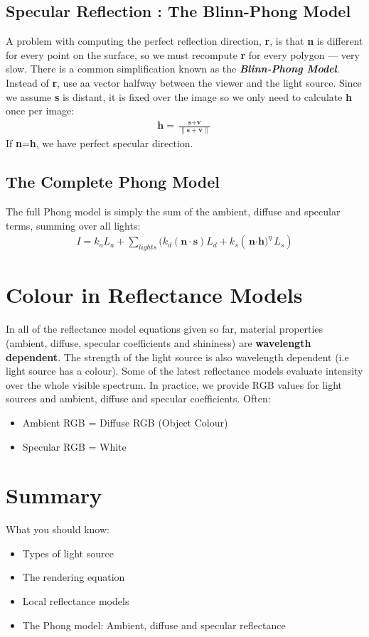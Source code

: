 \documentclass{article}
\begin{document}
\subsection{Specular Reflection : The Blinn-Phong Model}
A problem with computing the perfect reflection direction, \textbf{r}, is that \textbf{n} is different for every point on the surface, so we must recompute \textbf{r} for every polygon --- very slow.
There is a common simplification known as the \textbf{\textit{Blinn-Phong Model}}.
Instead of \textbf{r}, use aa vector halfway between the viewer and the light source.
Since we assume \textbf{s} is distant, it is fixed over the image so we only need to calculate \textbf{h} once per image:
\begin{align*}
	\textbf{h} = \frac{\textbf{s} + \textbf{v}}{\|\textbf{s} + \textbf{v}\|}
\end{align*}
If \textbf{n}=\textbf{h}, we have perfect specular direction.

\subsection{The Complete Phong Model}
The full Phong model is simply the sum of the ambient, diffuse and specular terms, summing over all lights:
\begin{align*}
	I = k_aL_a + \sum_{lights}(k_d(\textbf{n$\cdot$s})L_d + k_s(\textbf{n$\cdot$h)}^{\eta}L_s)
\end{align*}

\section{Colour in Reflectance Models}
In all of the reflectance model equations given so far, material properties (ambient, diffuse, specular coefficients and shininess) are \textbf{wavelength dependent}.
The strength of the light source is also wavelength dependent (i.e light source has a colour).
Some of the latest reflectance models evaluate intensity over the whole visible spectrum.
In practice, we provide RGB values for light sources and ambient, diffuse and specular coefficients.
Often:
\begin{itemize}
	\item Ambient RGB = Diffuse RGB (Object Colour)
	\item Specular RGB = White
\end{itemize}

\section{Summary}
What you should know:
\begin{itemize}
	\item Types of light source
	\item The rendering equation
	\item Local reflectance models
	\item The Phong model: Ambient, diffuse and specular reflectance
\end{itemize}
\end{document}
